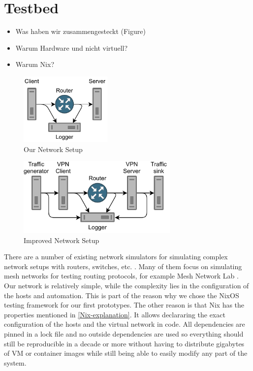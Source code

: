 \section{Testbed}
\begin{itemize}
  \item Was haben wir zusammengesteckt (Figure)
  \item Warum Hardware und nicht virtuell?
  \item Warum Nix?
\end{itemize}
\begin{figure}[tbh]
	\centering
	\includegraphics[draft=false,width=0.4\textwidth]{figures/Network schematic/actual/setup.pdf}
	\caption{Our Network Setup}\label{fig:actual_network_schematic}
\end{figure}
\begin{figure}[tbh]
	\centering
	\includegraphics[draft=false,width=0.7\textwidth]{figures/Network schematic/optimal/setup.pdf}
	\caption{Improved Network Setup}\label{fig:optimal_network_schematic}
\end{figure}
There are a number of existing network simulators for simulating complex network setups with routers, switches, etc. \cite{network-simulators-list}.
Many of them focus on simulating mesh networks for testing routing protocols, for example Mesh Network Lab \cite{meshnet-lab}.
Our network is relatively simple, while the complexity lies in the configuration of the hosts and automation.
This is part of the reason why we chose the NixOS testing framework for our first prototypes.
The other reason is that Nix has the properties mentioned in \ref{Nix-explanation}.
It allows declararing the exact configuration of the hosts and the virtual network in code.
All dependencies are pinned in a lock file and no outside dependencies are used so everything should still be reproducible in a decade or more without having to distribute gigabytes of VM or container images while still being able to easily modify any part of the system.

